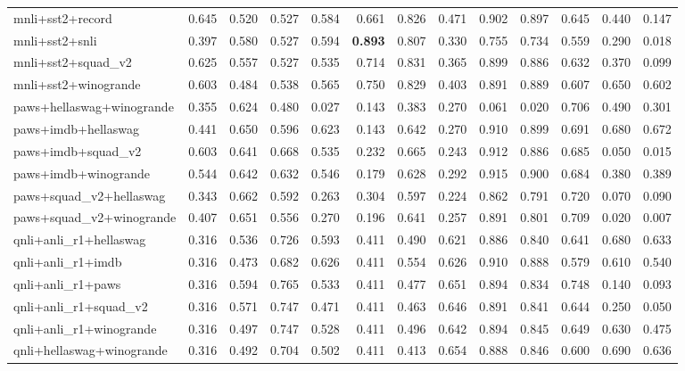 \begin{table}[t]
\begin{tabular}{lrrrrrrrrrrrr}
    mnli+sst2+record & 0.645 & 0.520 & 0.527 & 0.584 & 0.661 & 0.826 & 0.471 & 0.902 & 0.897 & 0.645 & 0.440 & 0.147 \\
    mnli+sst2+snli & 0.397 & 0.580 & 0.527 & 0.594 & \textbf{0.893} & 0.807 & 0.330 & 0.755 & 0.734 & 0.559 & 0.290 & 0.018 \\
    mnli+sst2+squad\_v2 & 0.625 & 0.557 & 0.527 & 0.535 & 0.714 & 0.831 & 0.365 & 0.899 & 0.886 & 0.632 & 0.370 & 0.099 \\
    mnli+sst2+winogrande & 0.603 & 0.484 & 0.538 & 0.565 & 0.750 & 0.829 & 0.403 & 0.891 & 0.889 & 0.607 & 0.650 & 0.602 \\
    paws+hellaswag+winogrande & 0.355 & 0.624 & 0.480 & 0.027 & 0.143 & 0.383 & 0.270 & 0.061 & 0.020 & 0.706 & 0.490 & 0.301 \\
    paws+imdb+hellaswag & 0.441 & 0.650 & 0.596 & 0.623 & 0.143 & 0.642 & 0.270 & 0.910 & 0.899 & 0.691 & 0.680 & 0.672 \\
    paws+imdb+squad\_v2 & 0.603 & 0.641 & 0.668 & 0.535 & 0.232 & 0.665 & 0.243 & 0.912 & 0.886 & 0.685 & 0.050 & 0.015 \\
    paws+imdb+winogrande & 0.544 & 0.642 & 0.632 & 0.546 & 0.179 & 0.628 & 0.292 & 0.915 & 0.900 & 0.684 & 0.380 & 0.389 \\
    paws+squad\_v2+hellaswag & 0.343 & 0.662 & 0.592 & 0.263 & 0.304 & 0.597 & 0.224 & 0.862 & 0.791 & 0.720 & 0.070 & 0.090 \\
    paws+squad\_v2+winogrande & 0.407 & 0.651 & 0.556 & 0.270 & 0.196 & 0.641 & 0.257 & 0.891 & 0.801 & 0.709 & 0.020 & 0.007 \\
    qnli+anli\_r1+hellaswag & 0.316 & 0.536 & 0.726 & 0.593 & 0.411 & 0.490 & 0.621 & 0.886 & 0.840 & 0.641 & 0.680 & 0.633 \\
    qnli+anli\_r1+imdb & 0.316 & 0.473 & 0.682 & 0.626 & 0.411 & 0.554 & 0.626 & 0.910 & 0.888 & 0.579 & 0.610 & 0.540 \\
    qnli+anli\_r1+paws & 0.316 & 0.594 & 0.765 & 0.533 & 0.411 & 0.477 & 0.651 & 0.894 & 0.834 & 0.748 & 0.140 & 0.093 \\
    qnli+anli\_r1+squad\_v2 & 0.316 & 0.571 & 0.747 & 0.471 & 0.411 & 0.463 & 0.646 & 0.891 & 0.841 & 0.644 & 0.250 & 0.050 \\
    qnli+anli\_r1+winogrande & 0.316 & 0.497 & 0.747 & 0.528 & 0.411 & 0.496 & 0.642 & 0.894 & 0.845 & 0.649 & 0.630 & 0.475 \\
    qnli+hellaswag+winogrande & 0.316 & 0.492 & 0.704 & 0.502 & 0.411 & 0.413 & 0.654 & 0.888 & 0.846 & 0.600 & 0.690 & 0.636 \\

\end{tabular}
\end{table}
